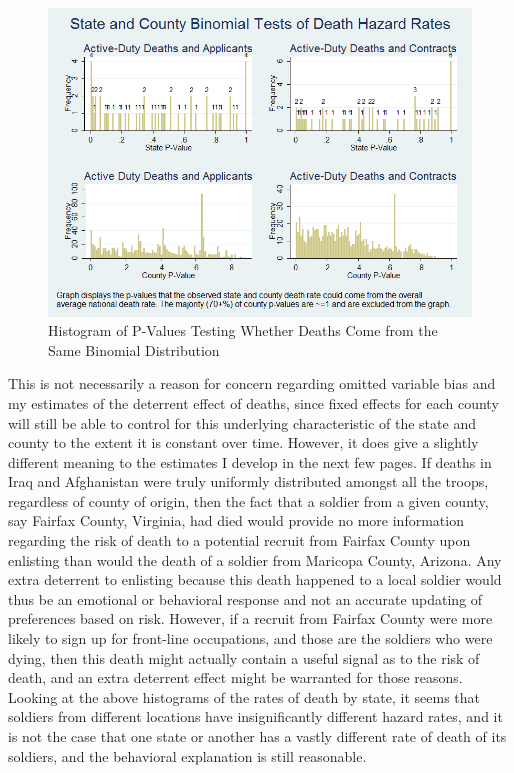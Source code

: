 \documentclass[12pt] {article}
\begin{document}
\begin{figure}
\includegraphics[scale=0.6]{../Output/hist_binomial_combined.png}
\caption{Histogram of P-Values Testing Whether Deaths Come from the
Same Binomial Distribution}
\label{Flo:Pat's Histo}
\end{figure}
\clearpage{}

This is not necessarily a reason for concern regarding omitted variable bias and my estimates of the deterrent effect of deaths,
since fixed effects for each county will still be able to control for this underlying characteristic of the state and county to the extent it is constant over time. However, it does give a slightly different meaning to the estimates I develop in the next few pages. If deaths in Iraq and Afghanistan were truly uniformly
distributed amongst all the troops, regardless of county of origin, then the fact that a soldier from a given county, say Fairfax
County, Virginia, had died would provide no more information regarding
the risk of death to a potential recruit from Fairfax County upon
enlisting than would the death of a soldier from Maricopa County,
Arizona. Any extra deterrent to enlisting because this death happened to a local soldier would thus be an emotional or behavioral response and not
an accurate updating of preferences based on risk. However, if a recruit
from Fairfax County were more likely to sign up for front-line occupations,
and those are the soldiers who were dying, then this death might actually
contain a useful signal as to the risk of death, and an extra deterrent
effect might be warranted for those reasons. Looking at the above
histograms of the rates of death by state, it seems that soldiers
from different locations have insignificantly different hazard rates, and
it is not the case that one state or another has a vastly different
rate of death of its soldiers, and the behavioral explanation is still reasonable.
\end{document}
